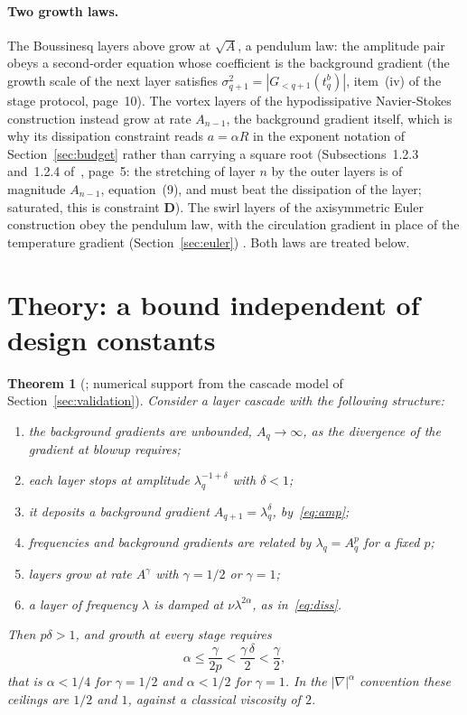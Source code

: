 \documentclass[11pt]{article}
\newtheorem{theorem}{Theorem}[section]
\theoremstyle{remark}
\newcommand{\ev}[1]{\hspace{0.2em}{\small\textsf{[#1]}}}
\begin{document}
\paragraph{Two growth laws.} The Boussinesq layers above grow at $\sqrt A$, a pendulum law: the
amplitude pair obeys a second-order equation whose coefficient is the background gradient \ev{V}
(the growth scale of the next layer satisfies $\sigma_{q+1}^{2}=|G_{<q+1}(t^{b}_{q})|$, item~(iv) of the
stage protocol, page~10). The vortex layers of the hypodissipative Navier-Stokes construction instead grow at rate
$A_{n-1}$, the background gradient itself, which is why its dissipation constraint reads $a=\alpha R$
in the exponent notation of Section~\ref{sec:budget} rather than carrying a square root \ev{V}
(Subsections~1.2.3 and~1.2.4 of~\cite{cmz}, page~5: the stretching of layer $n$ by the outer layers
is of magnitude $A_{n-1}$, equation~(9), and must beat the dissipation of the layer; saturated, this is
constraint \textbf{D}). The swirl layers of the axisymmetric
Euler construction obey the pendulum law, with the circulation gradient in place of the temperature
gradient (Section~\ref{sec:euler}) \ev{V}. Both laws are treated below.

\section{Theory: a bound independent of design constants}\label{sec:class}

\begin{theorem}[\ev{D}; numerical support \ev{MV} from the cascade model of Section~\ref{sec:validation}]\label{thm:class}
Consider a layer cascade with the following structure:
\begin{enumerate}
\item[(A0)] the background gradients are unbounded, $A_{q}\to\infty$, as the divergence of the
gradient at blowup requires;
\item[(A1)] each layer stops at amplitude $\lambda_{q}^{-1+\delta}$ with $\delta<1$;
\item[(A2)] it deposits a background gradient $A_{q+1}=\lambda_{q}^{\delta}$, by~\eqref{eq:amp};
\item[(A3)] frequencies and background gradients are related by $\lambda_{q}=A_{q}^{p}$ for a fixed $p$;
\item[(A4)] layers grow at rate $A^{\gamma}$ with $\gamma=1/2$ or $\gamma=1$;
\item[(A5)] a layer of frequency $\lambda$ is damped at $\nu\lambda^{2\alpha}$, as in~\eqref{eq:diss}.
\end{enumerate}
Then $p\delta>1$, and growth at every stage requires
\[
\alpha\le\frac{\gamma}{2p}<\frac{\gamma\,\delta}{2}<\frac{\gamma}{2},
\]
that is $\alpha<1/4$ for $\gamma=1/2$ and $\alpha<1/2$ for $\gamma=1$. In the $|\nabla|^{\alpha}$
convention these ceilings are $1/2$ and $1$, against a classical viscosity of $2$.
\end{theorem}
\end{document}
